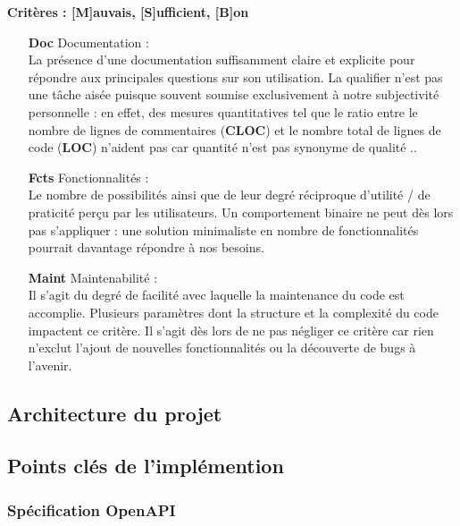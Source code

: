 \noindent\textbf{Critères : [M]auvais, [S]ufficient, [B]on}

\begin{itemize}
    \item[\textbf{Doc}] Documentation : \\
    La présence d'une documentation suffisamment claire et explicite pour répondre aux principales questions sur son utilisation.
    La qualifier n'est pas une tâche aisée puisque souvent soumise exclusivement à notre subjectivité personnelle : en effet, des mesures quantitatives tel que le ratio entre le nombre de lignes de commentaires (\textbf{CLOC}) et le nombre total de lignes de code (\textbf{LOC}) n'aident pas car quantité n'est pas synonyme de qualité .. 
    \item[\textbf{Fcts}] Fonctionnalités : \\
    Le nombre de possibilités ainsi que de leur degré réciproque d'utilité / de praticité perçu par les utilisateurs. Un comportement binaire ne peut dès lors pas s'appliquer : une solution minimaliste en nombre de fonctionnalités pourrait davantage répondre à nos besoins.
    \item[\textbf{Maint}] Maintenabilité : \\
    Il s'agit du degré de facilité avec laquelle la maintenance du code est accomplie. Plusieurs paramètres dont la structure et la complexité du code impactent ce critère. Il s'agit dès lors de ne pas négliger ce critère car rien n'exclut l'ajout de nouvelles fonctionnalités ou la découverte de bugs à l'avenir.
\end{itemize}

\subsection{Architecture du projet}

\subsection{Points clés de l'implémention}

\subsubsection*{Spécification OpenAPI}